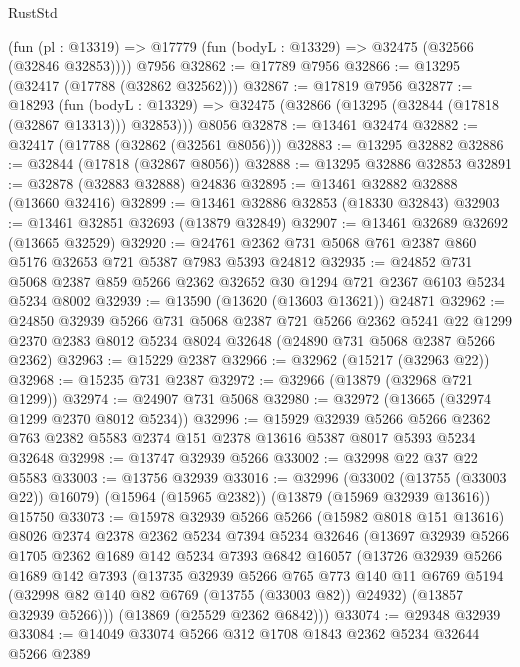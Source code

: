 \begin{lexlean}{RustStd}
\begin{coremodule}
    (fun (pl : @13319) => @17779 (fun (bodyL : @13329) => @32475 (@32566 (@32846 @32853))))
    @7956
@32862 := @17789 @7956
@32866 := @13295 (@32417 (@17788 (@32862 @32562)))
@32867 := @17819 @7956
@32877 := @18293
    (fun (bodyL : @13329) => @32475 (@32866 (@13295 (@32844 (@17818 (@32867 @13313))) @32853)))
    @8056
@32878 := @13461 @32474
@32882 := @32417 (@17788 (@32862 (@32561 @8056)))
@32883 := @13295 @32882
@32886 := @32844 (@17818 (@32867 @8056))
@32888 := @13295 @32886 @32853
@32891 := @32878 (@32883 @32888) @24836
@32895 := @13461 @32882 @32888 (@13660 @32416)
@32899 := @13461 @32886 @32853 (@18330 @32843)
@32903 := @13461 @32851 @32693 (@13879 @32849)
@32907 := @13461 @32689 @32692 (@13665 @32529)
@32920 := @24761 @2362 @731 @5068 @761 @2387 @860 @5176 @32653 @721 @5387 @7983 @5393 @24812
@32935 := @24852
    @731
    @5068
    @2387
    @859
    @5266
    @2362
    @32652
    @30
    @1294
    @721
    @2367
    @6103
    @5234
    @5234
    @8002
@32939 := @13590 (@13620 (@13603 @13621)) @24871
@32962 := @24850
    @32939
    @5266
    @731
    @5068
    @2387
    @721
    @5266
    @2362
    @5241
    @22
    @1299
    @2370
    @2383
    @8012
    @5234
    @8024
    @32648
    (@24890 @731 @5068 @2387 @5266 @2362)
@32963 := @15229 @2387
@32966 := @32962 (@15217 (@32963 @22))
@32968 := @15235 @731 @2387
@32972 := @32966 (@13879 (@32968 @721 @1299))
@32974 := @24907 @731 @5068
@32980 := @32972 (@13665 (@32974 @1299 @2370 @8012 @5234))
@32996 := @15929
    @32939
    @5266
    @5266
    @2362
    @763
    @2382
    @5583
    @2374
    @151
    @2378
    @13616
    @5387
    @8017
    @5393
    @5234
    @32648
@32998 := @13747 @32939 @5266
@33002 := @32998 @22 @37 @22 @5583
@33003 := @13756 @32939
@33016 := @32996
    (@33002 (@13755 (@33003 @22)) @16079)
    (@15964 (@15965 @2382))
    (@13879 (@15969 @32939 @13616))
    @15750
@33073 := @15978
    @32939
    @5266
    @5266
    (@15982 @8018 @151 @13616)
    @8026
    @2374
    @2378
    @2362
    @5234
    @7394
    @5234
    @32646
    (@13697
      @32939
      @5266
      @1705
      @2362
      @1689
      @142
      @5234
      @7393
      @6842
      @16057
      (@13726
        @32939
        @5266
        @1689
        @142
        @7393
        (@13735
          @32939
          @5266
          @765
          @773
          @140
          @11
          @6769
          @5194
          (@32998 @82 @140 @82 @6769 (@13755 (@33003 @82)) @24932)
          (@13857 @32939 @5266)))
      (@13869 (@25529 @2362 @6842)))
@33074 := @29348 @32939
@33084 := @14049 @33074 @5266 @312 @1708 @1843 @2362 @5234 @32644 @5266 @2389

\end{coremodule}
\end{lexlean}

